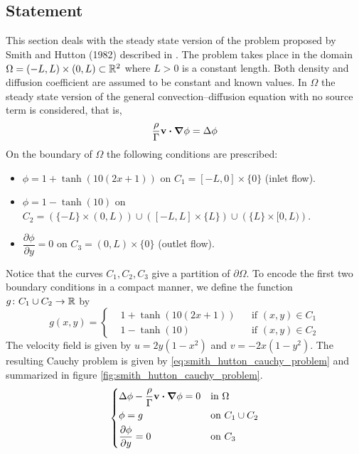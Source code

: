 
\subsection{Statement}

This section deals with the steady state version of the problem proposed by
Smith and Hutton (1982) described in \cite{smith1982numerical}. The problem
takes place in the domain $\Omega = (-L,L) \times (0,L) \subset \mathbb{R}^2$ where
$L > 0$ is a constant length. Both density and diffusion coefficient are assumed
to be constant and known values. In $\Omega$ the steady state version of the
general convection--diffusion equation with no source term is considered, that
is,
\begin{equation*}
	\frac{\rho}{\Gamma} \vb{v} \vdot \grad{\phi} = \Delta{\phi}
\end{equation*}
On the boundary of $\Omega$ the following conditions are prescribed:
\begin{itemize}[topsep=0pt]
	\item $\phi = 1 + \tanh(10(2x+1))$ on $C_1 = [-L,0] \times \{ 0 \}$ (inlet
	flow).
	\item $\phi = 1 - \tanh(10)$ on $C_2 = \left( \{ -L \} \times (0,L) \right)
	\cup \left( [-L,L] \times \{ L \} \right) \cup \left( \{ L \} \times [0,L)
	\right)$.
	\item $\dfrac{\partial \phi}{\partial y} = 0$ on $C_3 = (0,L) \times \{ 0
	\}$ (outlet flow).
\end{itemize}
Notice that the curves $C_1, C_2, C_3$ give a partition of $\partial \Omega$. To
encode the first two boundary conditions in a compact manner, we define the
function $g \colon C_1 \cup C_2 \rightarrow \mathbb{R}$ by
\begin{equation*}
	g(x,y) = 
	\left\{
	\begin{aligned}
		&1 + \tanh(10(2x + 1)) 	& &\text{if } (x,y) \in C_1 \\
		&1 - \tanh(10) 			& &\text{if } (x,y) \in C_2
	\end{aligned}
	\right.
\end{equation*}
The velocity field is given by $u = 2 y (1 - x^2)$ and $v = -2 x (1 - y^2)$. The
resulting Cauchy problem is given by \eqref{eq:smith_hutton_cauchy_problem} and
summarized in figure \ref{fig:smith_hutton_cauchy_problem}.
\begin{equation} \label{eq:smith_hutton_cauchy_problem} 
	\left\{
	\begin{aligned}
		&\Delta \phi - \frac{\rho}{\Gamma} \vb{v} \vdot \grad{\phi} = 0 &
		&\text{in } \Omega \\
		&\phi = g & 
		&\text{on } C_1 \cup C_2 \\
		&\frac{\partial \phi}{\partial y} = 0 & 
		&\text{on } C_3
	\end{aligned}
	\right.
\end{equation}

